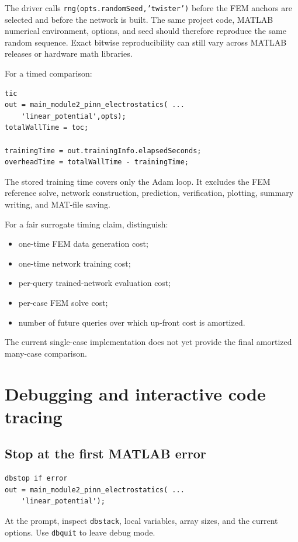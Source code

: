 \documentclass[11pt]{article}
\begin{document}
The driver calls \texttt{rng(opts.randomSeed,'twister')} before the FEM anchors are selected and before the network is built. The same project code, MATLAB numerical environment, options, and seed should therefore reproduce the same random sequence. Exact bitwise reproducibility can still vary across MATLAB releases or hardware math libraries.

For a timed comparison:
\begin{lstlisting}[style=projectmatlab]
tic
out = main_module2_pinn_electrostatics( ...
    'linear_potential',opts);
totalWallTime = toc;

trainingTime = out.trainingInfo.elapsedSeconds;
overheadTime = totalWallTime - trainingTime;
\end{lstlisting}
The stored training time covers only the Adam loop. It excludes the FEM reference solve, network construction, prediction, verification, plotting, summary writing, and MAT-file saving.

For a fair surrogate timing claim, distinguish:
\begin{itemize}[leftmargin=*]
  \item one-time FEM data generation cost;
  \item one-time network training cost;
  \item per-query trained-network evaluation cost;
  \item per-case FEM solve cost;
  \item number of future queries over which up-front cost is amortized.
\end{itemize}
The current single-case implementation does not yet provide the final amortized many-case comparison.

\section{Debugging and interactive code tracing}

\subsection{Stop at the first MATLAB error}

\begin{lstlisting}[style=projectmatlab]
dbstop if error
out = main_module2_pinn_electrostatics( ...
    'linear_potential');
\end{lstlisting}
At the prompt, inspect \texttt{dbstack}, local variables, array sizes, and the current options. Use \texttt{dbquit} to leave debug mode.
\end{document}
